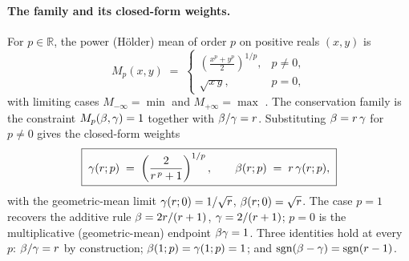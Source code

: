\paragraph{The family and its closed-form weights.}
For $p \in \mathbb{R}$, the power (Hölder) mean of order $p$ on positive
reals $(x, y)$ is
\begin{equation}
  M_p(x, y) \;=\;
  \begin{cases}
    \displaystyle \left( \frac{x^p + y^p}{2} \right)^{1/p}, & p \ne 0, \\[4pt]
    \displaystyle \sqrt{x\,y}, & p = 0,
  \end{cases}
  \label{eq:power-mean}
\end{equation}
with limiting cases $M_{-\infty} = \min$ and $M_{+\infty} = \max$
\cite{HLP1934}. The conservation family is the constraint
$M_p(\beta, \gamma) = 1$ together with $\beta/\gamma = r$.
Substituting $\beta = r\,\gamma$ for $p \ne 0$ gives the
closed-form weights
\begin{equation}
  \boxed{\;
    \gamma(r; p) \;=\;
    \left( \frac{2}{r^{\,p} + 1} \right)^{1/p},
    \qquad
    \beta(r; p) \;=\; r\,\gamma(r; p),
  \;}
  \label{eq:power-mean-weights}
\end{equation}
with the geometric-mean limit $\gamma(r; 0) = 1/\sqrt{r}$,
$\beta(r; 0) = \sqrt{r}$. The case $p = 1$ recovers the
additive rule $\beta = 2r/(r + 1)$,
$\gamma = 2/(r + 1)$; $p = 0$ is the multiplicative
(geometric-mean) endpoint $\beta\gamma = 1$. Three identities hold at
every $p$: $\beta/\gamma = r$ by construction;
$\beta(1; p) = \gamma(1; p) = 1$; and
$\operatorname{sgn}(\beta - \gamma) = \operatorname{sgn}(r - 1)$.

